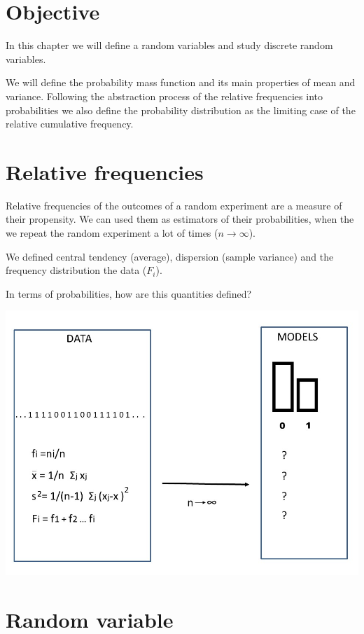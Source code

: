 \documentclass[
]{book}
\begin{document}
\hypertarget{objective-1}{%
\section{Objective}\label{objective-1}}

In this chapter we will define a random variables and study discrete random variables.

We will define the probability mass function and its main properties of mean and variance. Following the abstraction process of the relative frequencies into probabilities we also define the probability distribution as the limiting case of the relative cumulative frequency.

\hypertarget{relative-frequencies-2}{%
\section{Relative frequencies}\label{relative-frequencies-2}}

Relative frequencies of the outcomes of a random experiment are a measure of their propensity. We can used them as estimators of their probabilities, when the we repeat the random experiment a lot of times (\(n \rightarrow \infty\)).

We defined central tendency (average), dispersion (sample variance) and the frequency distribution the data (\(F_i\)).

In terms of probabilities, how are this quantities defined?

\includegraphics{./figures/randomvar.JPG}

\hypertarget{random-variable}{%
\section{Random variable}\label{random-variable}}
\end{document}
